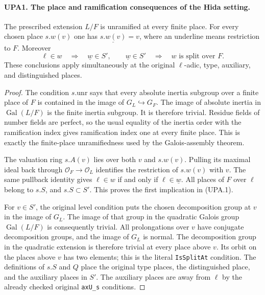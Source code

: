 \documentclass[11pt,a4paper]{article}
\numberwithin{equation}{section}
\theoremstyle{remark}\newtheorem{remark}[theorem]{Remark}
\begin{document}
\paragraph{UPA1. The place and ramification consequences of the Hida setting.}
\label{claim:UPA1}
The prescribed extension $L/F$ is unramified at every finite place.
For every chosen place $s.w(v)$ one has
$\underline{s.w(v)}=v$, where an underline means restriction to $F$.
Moreover
\[
 \ell\in w\quad\Longrightarrow\quad \underline w\in S',
 \qquad
 \underline w\in S'\quad\Longrightarrow\quad w\text{ is split over }F.
 \tag{UPA.1}
\]
These conclusions apply simultaneously at the original $\ell$-adic,
type, auxiliary, and distinguished places.
\begin{proof}
The condition $s.\mathrm{unr}$ says that every absolute inertia subgroup
over a finite place of $F$ is contained in the image of
$G_L\hookrightarrow G_F$.  The image of absolute inertia in
$\operatorname{Gal}(L/F)$ is the finite inertia subgroup.  It is
therefore trivial.  Residue fields of number fields are perfect, so
the usual equality of the inertia order with the ramification index
gives ramification index one at every finite place.  This is exactly
the finite-place unramifiedness used by the Galois-assembly theorem.

The valuation ring $s.A(v)$ lies over both $v$ and $s.w(v)$.
Pulling its maximal ideal back through
$\mathcal O_F\longrightarrow\mathcal O_L$ identifies the restriction
of $s.w(v)$ with $v$.  The same pullback identity gives
$\ell\in w$ if and only if $\ell\in\underline w$.
All places of $F$ over $\ell$ belong to $s.S$, and $s.S\subset S'$.
This proves the first implication in (UPA.1).

For $v\in S'$, the original level condition puts the chosen
decomposition group at $v$ in the image of $G_L$.
The image of that group in the quadratic Galois group
$\operatorname{Gal}(L/F)$ is consequently trivial.  All prolongations
over $v$ have conjugate decomposition groups, and the image of $G_L$
is normal.  The decomposition group in the quadratic extension is
therefore trivial at every place above $v$.  Its orbit on the places
above $v$ has two elements; this is the literal \texttt{Is\allowbreak Split\allowbreak At}
condition.  The definitions of $s.S$ and $Q$ place the original type
places, the distinguished place, and the auxiliary places in $S'$.
The auxiliary places are away from $\ell$ by the already checked
original \texttt{ax\allowbreak U\_\allowbreak s} conditions.
\end{proof}
\end{document}
